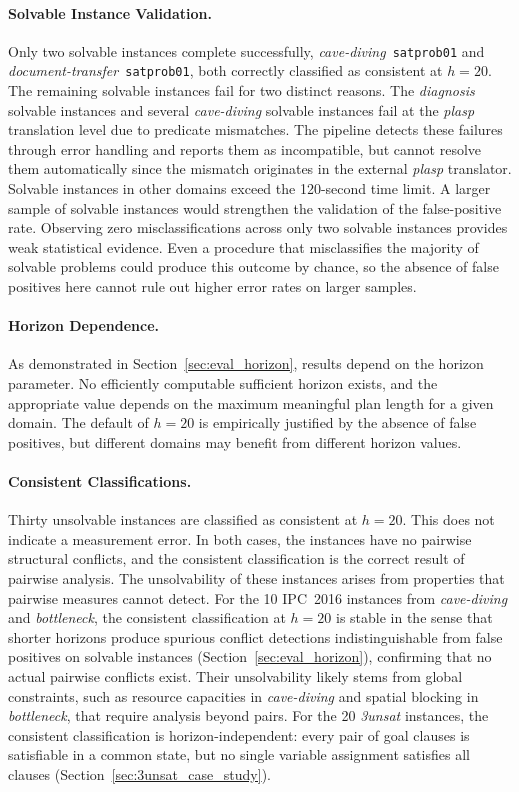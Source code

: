 \paragraph{Solvable Instance Validation.} Only two solvable instances complete successfully, \textit{cave-diving}~\texttt{satprob01} and \textit{document-transfer}~\texttt{satprob01}, both correctly classified as consistent at $h = 20$. The remaining solvable instances fail for two distinct reasons. The \textit{diagnosis} solvable instances and several \textit{cave-diving} solvable instances fail at the \textit{plasp} translation level due to predicate mismatches. The pipeline detects these failures through error handling and reports them as incompatible, but cannot resolve them automatically since the mismatch originates in the external \textit{plasp} translator. Solvable instances in other domains exceed the 120-second time limit. A larger sample of solvable instances would strengthen the validation of the false-positive rate. Observing zero misclassifications across only two solvable instances provides weak statistical evidence. Even a procedure that misclassifies the majority of solvable problems could produce this outcome by chance, so the absence of false positives here cannot rule out higher error rates on larger samples.

\paragraph{Horizon Dependence.} As demonstrated in Section~\ref{sec:eval_horizon}, results depend on the horizon parameter. No efficiently computable sufficient horizon exists, and the appropriate value depends on the maximum meaningful plan length for a given domain. The default of $h = 20$ is empirically justified by the absence of false positives, but different domains may benefit from different horizon values.

\paragraph{Consistent Classifications.} Thirty unsolvable instances are classified as consistent at $h = 20$. This does not indicate a measurement error. In both cases, the instances have no pairwise structural conflicts, and the consistent classification is the correct result of pairwise analysis. The unsolvability of these instances arises from properties that pairwise measures cannot detect. For the 10 \ac{IPC}~2016 instances from \textit{cave-diving} and \textit{bottleneck}, the consistent classification at $h = 20$ is stable in the sense that shorter horizons produce spurious conflict detections indistinguishable from false positives on solvable instances (Section~\ref{sec:eval_horizon}), confirming that no actual pairwise conflicts exist. Their unsolvability likely stems from global constraints, such as resource capacities in \textit{cave-diving} and spatial blocking in \textit{bottleneck}, that require analysis beyond pairs. For the 20 \textit{3unsat} instances, the consistent classification is horizon-independent: every pair of goal clauses is satisfiable in a common state, but no single variable assignment satisfies all clauses (Section~\ref{sec:3unsat_case_study}).

